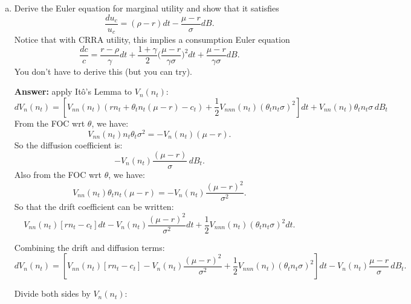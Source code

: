 \documentclass[11pt]{extarticle}
\theoremstyle{plain}
\theoremstyle{definition}
\begin{document}
\begin{enumerate}[(a)]
\item Derive the Euler equation for marginal utility and show that it satisfies 
\begin{equation*}
	\frac{du_c}{u_c} = (\rho - r) dt - \frac{\mu - r}{\sigma} dB.
\end{equation*}
Notice that with CRRA utility, this implies a consumption Euler equation 
\begin{equation*}
	\frac{dc}{c} = \frac{r - \rho}{\gamma} dt + \frac{1+\gamma}{2} \bigg( \frac{\mu - r}{\gamma \sigma} \bigg)^2 dt + \frac{\mu - r}{\gamma \sigma} dB.
\end{equation*}
You don't have to derive this (but you can try). 

\textbf{Answer:} apply Itô's Lemma to \( V_n(n_t) \):
\[
d V_n(n_t) =  \left[ V_{nn}(n_t)\left( r n_t + \theta_t n_t (\mu - r) - c_t \right) + \frac{1}{2} V_{nnn}(n_t)(\theta_t n_t \sigma)^2  \right]dt  + V_{nn}(n_t)\theta_t n_t \sigma \, dB_t
\]
From the FOC wrt $\theta$, we have:
   \[
   V_{nn}(n_t) n_t \theta_t \sigma^2 = - V_n(n_t) (\mu - r).
   \]
So the diffusion coefficient is:
\[
- V_n(n_t) \frac{(\mu - r)}{\sigma} \, dB_t.
\]
Also from the FOC wrt $\theta$, we have:
\[
   V_{nn}(n_t) \theta_t n_t (\mu - r) = - V_n(n_t) \frac{(\mu - r)^2}{\sigma^2}.
   \]
So that the drift coefficient can be written:
\[
 V_{nn}(n_t) \left[ r n_t - c_t \right] dt - V_n(n_t) \frac{(\mu - r)^2}{\sigma^2} dt + \frac{1}{2} V_{nnn}(n_t) (\theta_t n_t \sigma)^2 dt.
\]

 Combining the drift and diffusion terms:
\[
d V_n(n_t) = \left[  V_{nn}(n_t) \left[ r n_t - c_t \right]  - V_n(n_t) \frac{(\mu - r)^2}{\sigma^2}  + \frac{1}{2} V_{nnn}(n_t) (\theta_t n_t \sigma)^2  \right] dt - V_n(n_t) \frac{\mu - r}{\sigma} \, dB_t.
\]

Divide both sides by \( V_n(n_t) \):


\end{enumerate}
\end{document}

